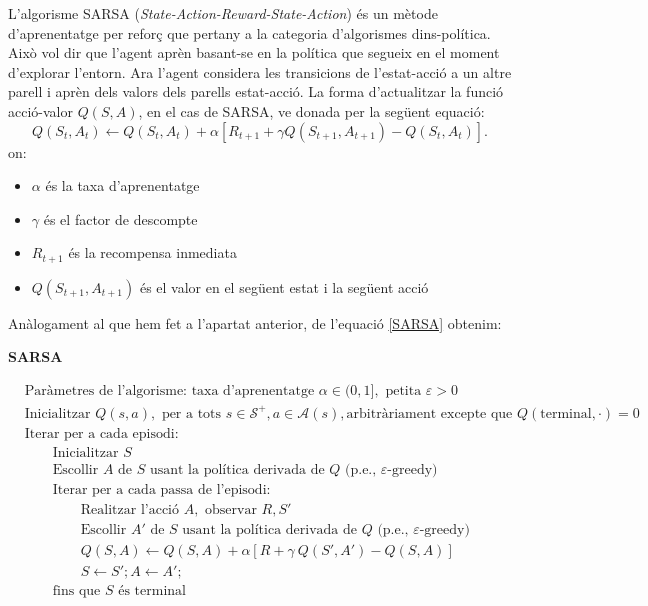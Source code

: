 \documentclass{article}
\begin{document}
L'algorisme SARSA (\textit{State-Action-Reward-State-Action}) és un mètode d'aprenentatge per reforç que pertany a la categoria d'algorismes dins-política. Això vol dir que l'agent aprèn basant-se en la política que segueix en el moment d'explorar l'entorn. Ara l'agent considera les transicions de l'estat-acció a un altre parell i aprèn dels valors dels parells estat-acció. La forma d'actualitzar la funció acció-valor \(Q(S,A)\), en el cas de SARSA, ve donada per la següent equació:
\begin{equation}
    Q(S_t, A_t) \leftarrow Q(S_t, A_t) + \alpha \left[ R_{t+1} + \gamma Q(S_{t+1}, A_{t+1}) - Q(S_t, A_t) \right].
\label{SARSA}
\end{equation}
on:
\begin{itemize}
    \item $\alpha$ és la taxa d'aprenentatge
    \item $\gamma$ és el factor de descompte
    \item $R_{t+1}$ és la recompensa inmediata
    \item $Q(S_{t+1},A_{t+1})$ és el valor en el següent estat i la següent acció
\end{itemize}
Anàlogament al que hem fet a l'apartat anterior, de l'equació \ref{SARSA} obtenim:
\begin{algorithm}[H]
\caption{\textbf{SARSA}}
\begin{align*}
& \text{Paràmetres de l'algorisme: taxa d'aprenentatge } \alpha \in (0,1], \text{ petita } \varepsilon > 0 \\
& \text{Inicialitzar } Q(s,a), \text{ per a tots } s \in \mathcal{S}^+, a \in \mathcal{A}(s), \text{arbitràriament excepte que } Q(\text{terminal},\cdot) = 0 \\
& \text{Iterar per a cada episodi:} \\
& \qquad \text{Inicialitzar } S \\
& \qquad \text{Escollir } A \text{ de } S \text{ usant la política derivada de } Q \text{ (p.e., }\varepsilon\text{-greedy)} \\
& \qquad \text{Iterar per a cada passa de l'episodi:} \\
& \qquad \qquad \text{Realitzar l'acció } A, \text{ observar } R, S' \\
& \qquad \qquad \text{Escollir } A' \text{ de } S \text{ usant la política derivada de } Q \text{ (p.e., }\varepsilon\text{-greedy)} \\
& \qquad \qquad Q(S,A) \leftarrow Q(S,A) + \alpha[R + \gamma \ Q(S',A') - Q(S,A)] \\
& \qquad \qquad S \leftarrow S'; A \leftarrow A'; \\
& \qquad \text{fins que } S \text{ és terminal}
\end{align*}
\label{pseudocodi-sarsa}
\end{algorithm}
\end{document}
